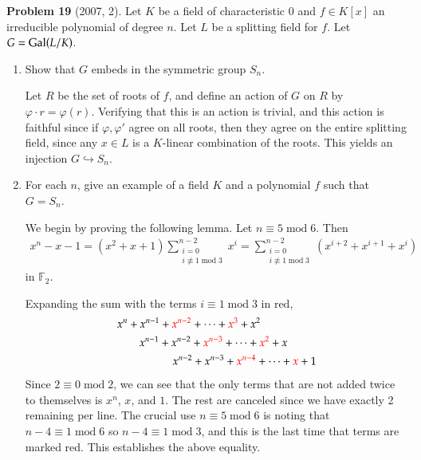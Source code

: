 \documentclass[12pt]{article}
\theoremstyle{definitionstyle}
\def\mbb#1{\mathbb{#1}}
\def \cph{\varphi}
\newcommand{\F}{\mbb F}
\newcommand{\Gal}{\mathrm{Gal}\qty}
\renewcommand{\mod}{\; \mathrm{mod}\;}
\begin{document}
	\textbf{Problem 19 }(2007, 2). Let $K$ be a field of characteristic 0 and $f \in K[x]$ an irreducible polynomial of degree $n$. Let $L$ be a splitting field for $f$. Let $G = \Gal(L/K)$.
	\begin{enumerate}[label=(\arabic*)]
		\item Show that $G$ embeds in the symmetric group $S_n$.
		
		Let $R$ be the set of roots of $f$, and define an action of $G$ on $R$ by $\cph \cdot r = \cph(r)$. Verifying that this is an action is trivial, and this action is faithful since if $\cph, \cph'$ agree on all roots, then they agree on the entire splitting field, since any $x \in L$ is a $K$-linear combination of the roots. This yields an injection $G \hookrightarrow S_n$.
		\item For each $n$, give an example of a field $K$ and a polynomial $f$ such that $G = S_n$.
		
		We begin by proving the following lemma. Let $n \equiv 5 \mod 6$. Then
		\begin{align*}
			x^n - x - 1 = (x^2+x+1) \sum_{\substack{i=0 \\ i \not \equiv 1 \mod 3}}^{n-2} x^i = \sum_{\substack{i=0 \\ i \not \equiv 1 \mod 3}}^{n-2} (x^{i+2} + x^{i+1} + x^i)
		\end{align*}
		in $\F_2$.
		
		Expanding the sum with the terms $i \equiv 1 \mod 3$ in red,
		\begin{align*}
			&x^n + x^{n-1} + \textcolor{red}{x^{n-2}} + \cdots + \textcolor{red}{x^3} + x^2 \\
			&\qquad x^{n-1} + x^{n-2} + \textcolor{red}{x^{n-3}} + \cdots + \textcolor{red}{x^2} + x \\
			&\quad \qquad \qquad x^{n-2} + x^{n-3} + \textcolor{red}{x^{n-4}} + \cdots + \textcolor{red}{x} + 1
		\end{align*}
		Since $2 \equiv 0 \mod 2$, we can see that the only terms that are not added twice to themselves is $x^n$, $x$, and $1$. The rest are canceled since we have exactly 2 remaining per line. The crucial use $n \equiv 5 \mod 6$ is noting that $n-4 \equiv 1 \mod 6$ so $n-4 \equiv 1 \mod 3$, and this is the last time that terms are marked red. This establishes the above equality. 
		

\end{enumerate}
\end{document}
